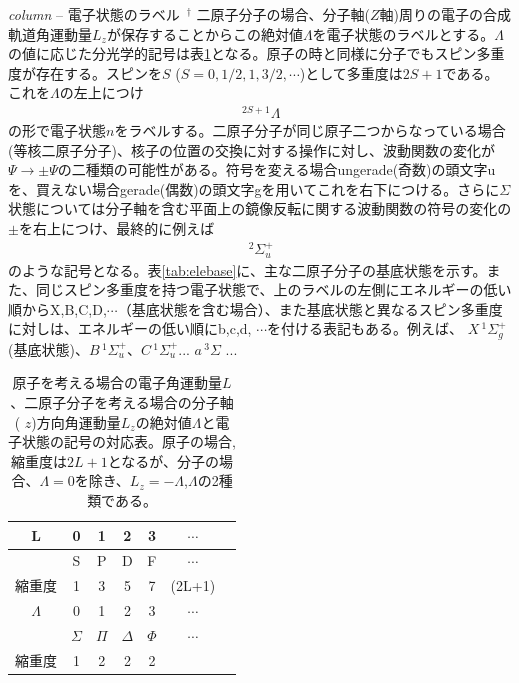 \begin{itembox}{{\it column} -- 電子状態のラベル $\,^\dagger$}
\footnotesize
二原子分子の場合、分子軸($Z$軸)周りの電子の合成軌道角運動量$L_z$が保存することからこの絶対値$\Lambda$を電子状態のラベルとする。$\Lambda$の値に応じた分光学的記号は表\ref{tab:spesymbol}となる。原子の時と同様に分子でもスピン多重度が存在する。スピンを$S
$ ($S=0,1/2,1,3/2,\cdots$)として多重度は$2S+1$である。これを$\Lambda$の左上につけ
\begin{eqnarray}
    \,^{2S+1} \Lambda
\end{eqnarray}
の形で電子状態$n$をラベルする。二原子分子が同じ原子二つからなっている場合(等核二原子分子)、核子の位置の交換に対する操作に対し、波動関数の変化が$\Psi \to \pm \Psi$の二種類の可能性がある。符号を変える場合ungerade(奇数)の頭文字uを、買えない場合gerade(偶数)の頭文字gを用いてこれを右下につける。さらに$\Sigma$状態については分子軸を含む平面上の鏡像反転に関する波動関数の符号の変化の$\pm$を右上につけ、最終的に例えば
\begin{eqnarray}
    \,^{2} \Sigma_u^+
\end{eqnarray}
のような記号となる。表\ref{tab:elebase}に、主な二原子分子の基底状態を示す。また、同じスピン多重度を持つ電子状態で、上のラベルの左側にエネルギーの低い順からX,B,C,D,$\cdots$（基底状態を含む場合）、また基底状態と異なるスピン多重度に対しは、エネルギーの低い順にb,c,d, $\cdots$を付ける表記もある。例えば、
$X\,^1 \Sigma_g^+$ (基底状態)、$B\,^1 \Sigma_u^+$、$C\,^1 \Sigma_u^+$... $a \,^3 \Sigma$ ...
\end{itembox}


\begin{table}[]
    \centering
    \begin{tabular}{c|cccccc}
    \hline\hline
        L & 0 & 1 & 2 & 3 & $\cdots$  \\
        \hline
          & S & P & D & F & $\cdots$  \\
          縮重度 & 1 & 3 & 5 & 7 & (2L+1) \\
        \hline\hline
        $\Lambda$ & 0 & 1 & 2 & 3 & $\cdots$  \\
        \hline
& $\Sigma$ & $\Pi$ & $\Delta$ & $\Phi$ & $\cdots$ \\
        縮重度 & 1 & 2 & 2 & 2 &  
    \end{tabular}
    \caption{原子を考える場合の電子角運動量$L$、二原子分子を考える場合の分子軸(
    $z$)方向角運動量$L_z$の絶対値$\Lambda$と電子状態の記号の対応表。原子の場合,
    縮重度は$2L+1$となるが、分子の場合、$\Lambda=0$を除き、$L_z = -\Lambda$,$\Lambda$の2種類である。}
    \label{tab:spesymbol}
\end{table}

